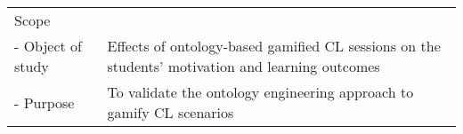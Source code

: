 \begin{longtable}[c]{lllll}
Scope                                                                     &                                                                                                                                                                                                                    &                                                                                                                                                                                   &                                                                                                                                                                                         &                                                                                                                                                                                                                                                                    \\
- Object of study                                                         & \multicolumn{4}{l}{Effects of ontology-based gamified CL sessions on the students' motivation and learning outcomes}                                                                                                                                                                                                                                                                                                                                                                                                                                                                                                                                                                                                                                                                                                                                                  \\
- Purpose                                                                 & \multicolumn{4}{l}{To validate the ontology engineering approach to gamify CL scenarios}                                                                                                                                                                                                                                                                                                                                                                                                                                                                                                                                                                                                                                                                                                                                                                              \\

\end{longtable}
